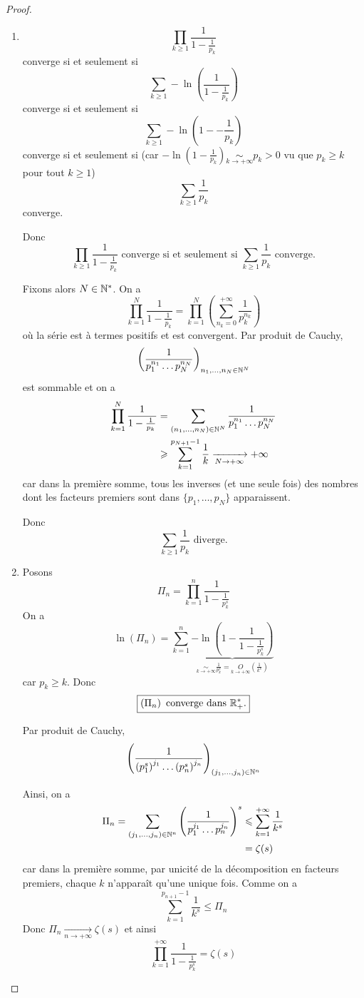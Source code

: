 \begin{proof}
	\phantom{}
	\begin{enumerate}
		\item $$\prod_{k\geqslant1}\frac{1}{1-\frac{1}{p_{k}}}$$
		converge si et seulement si 
		$$\sum_{k\geqslant1}-\ln\left(\frac{1}{1-\frac{1}{p_{k}}}\right)$$
		converge si et seulement si 
		$$\sum_{k\geqslant1}-\ln\left(1--\frac{1}{p_{k}}\right)$$
		converge si et seulement si (car $-\ln\left(1-\frac{1}{p_{k}}\right)\underset{k\to+\infty}{\sim}p_{k}>0$ vu que $p_{k}\geqslant k$ pour tout $k\geqslant1$)
		$$\sum_{k\geqslant1}\frac{1}{p_{k}}$$
		converge.

		Donc 
		$$\boxed{\prod_{k\geqslant1}\frac{1}{1-\frac{1}{p_{k}}}\text{ converge si et seulement si }\sum_{k\geqslant 1}\frac{1}{p_{k}}\text{ converge.}}$$

		Fixons alors $N\in\mathbb{N}^{*}$. On a 
		$$\prod_{k=1}^{N}\frac{1}{1-\frac{1}{p_{k}}}=\prod_{k=1}^{N}\left(\sum_{n_{k}=0}^{+\infty}\frac{1}{p_{k}^{n_{k}}}\right)$$
		où la série est à termes positifs et est convergent. Par produit de Cauchy,
		$$\left(\frac{1}{p_{1}^{n_{1}}\dots p_{N}^{n_{N}}}\right)_{n_{1},\dots,n_{N}\in\mathbb{N}^{N}}$$
		est sommable et on a
		\begin{align*}
			\prod_{k=1}^{N}\frac{1}{1-\frac{1}{p_{k}}}
			&=\sum_{(n_{1},\dots,n_{N})\in\mathbb{N}^{N}}\frac{1}{p_{1}^{n_{1}}\dots p_{N}^{n_{N}}}\\
			&\geqslant \sum_{k=1}^{p_{N+1}-1}\frac{1}{k}\xrightarrow[N\to+\infty]{}+\infty
		\end{align*}
		car dans la première somme, tous les inverses (et une seule fois) des nombres dont les facteurs premiers sont dans $\{p_{1},\dots,p_{N}\}$ apparaissent.

		Donc 
		$$\boxed{\sum_{k\geqslant1}\frac{1}{p_{k}}\text{ diverge.}}$$

		\item Posons 
		$$\Pi_{n}=\prod_{k=1}^{n}\frac{1}{1-\frac{1}{p_{k}^{s}}}$$
		On a 
		$$\ln\left(\Pi_{n}\right)=\sum_{k=1}^{n}\underbrace{-\ln\left(1-\frac{1}{1-\frac{1}{p_{k}^{s}}}\right)}_{\underset{k\to+\infty}{\sim}\frac{1}{p_{k}^{s}}=\underset{k\to+\infty}{O}\left(\frac{1}{k^{s}}\right)}$$
		car $p_{k}\geqslant k$. 
		Donc 
		$$\boxed{\left(\Pi_{n}\right)\text{ converge dans }\mathbb{R}_{+}^{*}\text{.}}$$
		
		Par produit de Cauchy,
		$$\left(\frac{1}{\left(p_{1}^{s}\right)^{j_{1}}\dots\left(p_{n}^{s}\right)^{j_{n}}}\right)_{(j_{1},\dots,j_{n})\in\mathbb{N}^{n}}$$
		
		Ainsi, on a 
		\begin{align*}
			\Pi_{n}=\sum_{(j_{1},\dots,j_{n})\in\mathbb{N}^{n}}\left(\frac{1}{p_{1}^{j_{1}}\dots p_{n}^{j_{n}}}\right)^{s}
			&\leqslant\sum_{k=1}^{+\infty}\frac{1}{k^{s}}\\
			&=\zeta(s)
		\end{align*}
		car dans la première somme, par unicité de la décomposition en facteurs premiers, chaque $k$ n'apparaît qu'une unique fois.
		Comme on a 
		$$\sum_{k=1}^{p_{n+1}-1}\frac{1}{k^{s}}\leqslant \Pi_{n}$$
		Donc $\Pi_{n}\xrightarrow[n\to+\infty]{}\zeta(s)$ et ainsi 
		$$\boxed{\prod_{k=1}^{+\infty}\frac{1}{1-\frac{1}{p_{k}^{s}}}=\zeta(s)}$$


\end{enumerate}
\end{proof}
